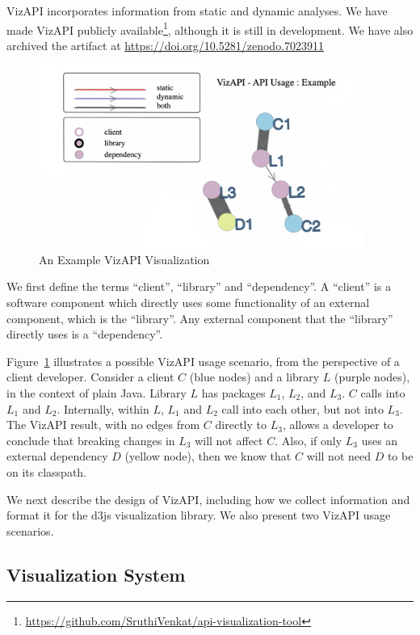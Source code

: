 VizAPI incorporates information from static and dynamic analyses. 
We have made VizAPI publicly available\footnote{\url{https://github.com/SruthiVenkat/api-visualization-tool}}, although it is still in development. We have also archived the artifact at \href{https://doi.org/10.5281/zenodo.7023911}{https://doi.org/10.5281/zenodo.7023911}

\begin{figure}[h]
\begin{center}
\includegraphics[height=6cm]{images/intro-example.png}
\caption{An Example VizAPI Visualization}
\label{fig:example}
\end{center}
\end{figure}

We first define the terms ``client'', ``library'' and ``dependency''. A ``client'' is a software component which directly uses some functionality of an external component, which is the ``library''. Any external component that the ``library'' directly uses is a ``dependency''. 

Figure~\ref{fig:example} illustrates a possible VizAPI usage scenario, from the perspective of a client developer. Consider a client $C$ (blue nodes) and a library $L$ (purple nodes), in the context of plain Java. Library $L$ has packages $L_1$, $L_2$, and $L_3$. $C$ calls into $L_1$ and $L_2$. Internally, within $L$, $L_1$ and $L_2$ call into each other, but not into $L_3$. The VizAPI result, with no edges from $C$ directly to $L_3$, allows a developer to conclude that breaking changes in $L_3$ will not affect $C$. Also, if only $L_3$ uses an external dependency $D$ (yellow node), then we know that $C$ will not need $D$ to be on its classpath.


We next describe the design of VizAPI, including how we
collect information and format it for the d3js visualization
library. We also present two VizAPI usage scenarios.

\subsection{Visualization System}
\label{subsec:vis-system}


